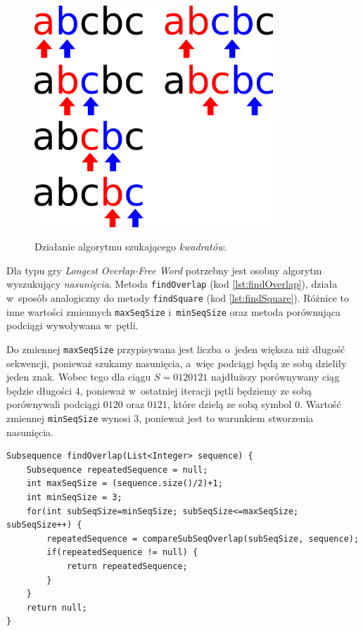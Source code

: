 \documentclass[document]{xmgr}
\begin{document}
\begin{figure}[tbh]
    \centering
    \caption{Działanie algorytmu szukającego \emph{kwadratów}.}
    \includegraphics[width = 0.8\textwidth]{images/squareFinding}
    \label{fig:squareFinding}
\end{figure}

Dla typu gry \emph{Longest Overlap-Free Word} potrzebny jest osobny algorytm wyszukujący  \emph{nasunięcia}. Metoda \texttt{findOverlap} (kod \ref{lst:findOverlap}), działa w~sposób analogiczny do metody \texttt{findSquare} (kod \ref{lst:findSquare}). Różnice to inne wartości zmiennych \texttt{maxSeqSize} i~\texttt{minSeqSize} oraz metoda porównująca podciągi wywoływana w~pętli.

Do zmiennej \texttt{maxSeqSize} przypisywana jest liczba o~jeden większa niż długość sekwencji, ponieważ szukamy nasunięcia, a~więc podciągi będą ze sobą dzieliły jeden znak. Wobec tego dla ciągu $S = 0120121$ najdłuższy porównywany ciąg będzie długości $4$, ponieważ w~ostatniej iteracji pętli będziemy ze sobą porównywali podciągi $0120$ oraz $0121$, które dzielą ze sobą symbol $0$. Wartość zmiennej \texttt{minSeqSize} wynosi $3$, ponieważ jest to warunkiem stworzenia nasunięcia.

\begin{lstlisting}[caption={Metoda szukająca \emph{nasunięć} wewnątrz listy.},label=lst:findOverlap]
Subsequence findOverlap(List<Integer> sequence) {
	Subsequence repeatedSequence = null;
	int maxSeqSize = (sequence.size()/2)+1;
	int minSeqSize = 3;
	for(int subSeqSize=minSeqSize; subSeqSize<=maxSeqSize; subSeqSize++) {
		repeatedSequence = compareSubSeqOverlap(subSeqSize, sequence);
		if(repeatedSequence != null) {
			return repeatedSequence;
		}
	}
	return null;
}
\end{lstlisting}
\end{document}
